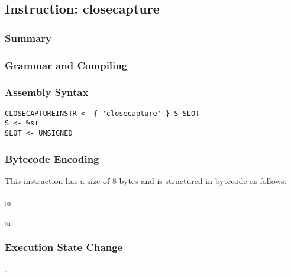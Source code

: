 \subsection{Instruction: closecapture}

\subsubsection{Summary}


\subsubsection{Grammar and Compiling}


\subsubsection{Assembly Syntax}

\begin{myquote}
\begin{verbatim}
CLOSECAPTUREINSTR <- { 'closecapture' } S SLOT
S <- %s+
SLOT <- UNSIGNED
\end{verbatim}
\end{myquote}


\subsubsection{Bytecode Encoding}

This instruction has a size of 8 bytes and is structured in bytecode as follows:

$_{00}$\ 



$_{04}$\ 


\subsubsection{Execution State Change}

.


